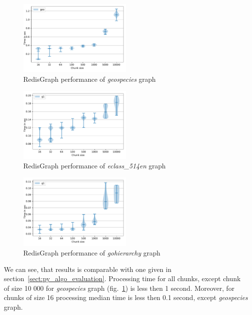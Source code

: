 \begin{figure}[h]
\centering
\includegraphics[width=0.5\textwidth]{data/raw_redis/geospecies.pdf}
\caption{RedisGraph performance of \textit{geospecies} graph}
\label{fig:redis_geospecies_all}
\end{figure}

\begin{figure}[h]
\centering
\includegraphics[width=0.5\textwidth]{data/raw_redis/eclass_514en.pdf}
\caption{RedisGraph performance of \textit{eclass\_514en} graph}
\label{fig:redis_eclass_all}
\end{figure}

\begin{figure}[h]
\centering
\includegraphics[width=0.5\textwidth]{data/raw_redis/gohierarchy.pdf}
\caption{RedisGraph performance of \textit{gohierarchy} graph}
\label{fig:redis_gohierarchy_all}
\end{figure}

We can see, that results is comparable with one given in section~\ref{sect:py_algo_evaluation}. 
Processing time for all chunks, except chunk of size 10 000 for \textit{geospecies} graph (fig.~\ref{fig:redis_geospecies_all}) is less then 1 second.
Moreover, for chunks of size 16 processing median time is less then 0.1 second, except \textit{geospecies} graph.

